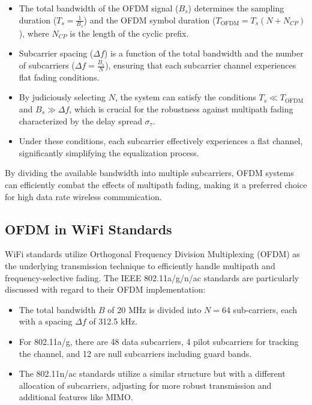 \begin{itemize}
    \item The total bandwidth of the OFDM signal (\(B_s\)) determines the sampling duration (\(T_s = \frac{1}{B_s}\)) and the OFDM symbol duration (\(T_{\text{OFDM}} = T_s(N + N_{CP})\)), where \(N_{CP}\) is the length of the cyclic prefix.
    \item Subcarrier spacing (\(\Delta f\)) is a function of the total bandwidth and the number of subcarriers (\(\Delta f = \frac{B_s}{N}\)), ensuring that each subcarrier channel experiences flat fading conditions.
    \item By judiciously selecting \(N\), the system can satisfy the conditions \(T_s \ll T_{\text{OFDM}}\) and \(B_s \gg \Delta f\), which is crucial for the robustness against multipath fading characterized by the delay spread \(\sigma_\tau\).
    \item Under these conditions, each subcarrier effectively experiences a flat channel, significantly simplifying the equalization process.
\end{itemize}

By dividing the available bandwidth into multiple subcarriers, OFDM systems can efficiently combat the effects of multipath fading, making it a preferred choice for high data rate wireless communication.

\subsection*{OFDM in WiFi Standards}

WiFi standards utilize Orthogonal Frequency Division Multiplexing (OFDM) as the underlying transmission technique to efficiently handle multipath and frequency-selective fading. The IEEE 802.11a/g/n/ac standards are particularly discussed with regard to their OFDM implementation:

\begin{itemize}
    \item The total bandwidth \( B \) of 20 MHz is divided into \( N = 64 \) sub-carriers, each with a spacing \( \Delta f \) of 312.5 kHz.
    \item For 802.11a/g, there are 48 data subcarriers, 4 pilot subcarriers for tracking the channel, and 12 are null subcarriers including guard bands.
    \item The 802.11n/ac standards utilize a similar structure but with a different allocation of subcarriers, adjusting for more robust transmission and additional features like MIMO.
\end{itemize}

